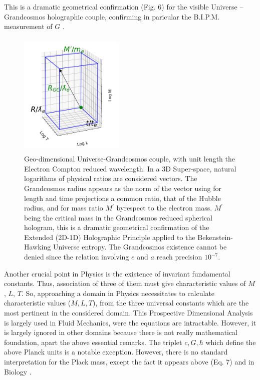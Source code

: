 \documentclass[twoside,draft]{article}
\begin{document}
\begin{sloppypar}
This is a dramatic geometrical confirmation (Fig. 6) for the visible Universe – Grandcosmos holographic couple, confirming in paricular the B.I.P.M. measurement of $G$ \cite{Quinn}.


\begin{figure}[h]
\centering
\includegraphics[width=5cm,height=6cm]{./figures/triaxis.png}
\caption{Geo-dimensional Universe-Grandcosmos couple, with unit length the Electron Compton reduced wavelength. In a 3D Super-space, natural logarithms of physical ratios are considered vectors. The Grandcosmos radius appears as the norm of the vector using for length and time projections a common ratio, that of the Hubble radius, and for mass ratio $M^{\prime}$ byrespect to the electron mass. $M^{\prime}$ being the critical mass in the Grandcosmos reduced spherical hologram, this is a dramatic geometrical confirmation of the Extended (2D-1D) Holographic Principle applied to the Bekenstein-Hawking Universe entropy. The Grandcosmos existence cannot be denied since the relation involving $e$ and $a$ reach precision $10^{-7}$.} 
\end{figure}

Another crucial point in Physics is the existence of invariant fundamental constants. Thus, association of three of them must give characteristic values of $M$, $L$, $T$. So, approaching a domain in Physics necessitates to calculate characteristic values ($M, L, T$), from the three universal constants which are the most pertinent in the considered domain. This Prospective Dimensional Analysis is largely used in Fluid Mechanics, were the equations are intractable. However, it is largely ignored in other domains because there is not really mathematical foundation, apart the above essential remarks. The triplet $c, G, \hbar$ which define the above Planck units is a notable exception. However, there is no standard interpretation for the Plack mass, except the fact it appears above (Eq. 7) and in Biology \cite{Sanchez1}. 


\end{sloppypar}
\end{document}
